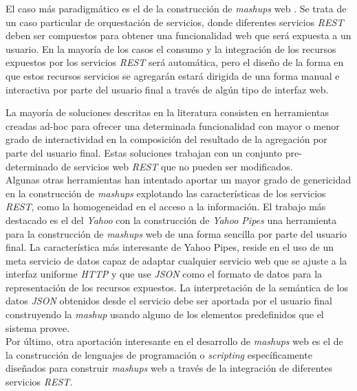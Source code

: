 El caso m\'as paradigm\'atico es el de la construcci\'on de \textit{mashups} web \cite{mashups}. Se trata de un caso particular de orquestaci\'on de servicios, donde diferentes servicios \textit{REST} deben ser compuestos para obtener una funcionalidad web que ser\'a expuesta a un usuario. En la mayor\'ia de los casos el consumo y la integraci\'on de los recursos expuestos por los servicios \textit{REST} ser\'a autom\'atica, pero el dise\~no de la forma en que estos recursos servicios se agregar\'an estar\'a dirigida de una forma manual e interactiva por parte del usuario final a trav\'es de alg\'un tipo de interfaz web.

La mayor\'ia de soluciones descritas en la literatura consisten en herramientas creadas ad-hoc para ofrecer una determinada funcionalidad con mayor o menor grado de interactividad en la composici\'on del resultado de la agregaci\'on por parte del usuario final. Estas soluciones trabajan con un conjunto pre-determinado de servicios web \textit{REST} que no pueden ser modificados.\\

Algunas otras herramientas han intentado aportar un mayor grado de genericidad en la construcci\'on de \textit{mashups} explotando las caracter\'isticas de los servicios \textit{REST}, como la homogeneidad en el acceso a la informaci\'on. El trabajo m\'as destacado es el del \textit{Yahoo} con la construcci\'on de \textit{Yahoo Pipes} \cite{yahoo_pipes} una herramienta para la construcci\'on de \textit{mashups} web de una forma sencilla por parte del usuario final. La caracter\'istica m\'as interesante de Yahoo Pipes, reside en el uso de un meta servicio de datos capaz de adaptar cualquier servicio web que se ajuste a la interfaz uniforme \textit{HTTP} y que use \textit{JSON} como el formato de datos para la representaci\'on de los recursos expuestos. La interpretaci\'on de la sem\'antica de los datos \textit{JSON} obtenidos desde el servicio debe ser aportada por el usuario final construyendo la \textit{mashup} usando alguno de los elementos predefinidos que el sistema provee.\\

Por \'ultimo, otra aportaci\'on interesante en el desarrollo de \textit{mashups} web es el de la construcci\'on de lenguajes de programaci\'on o \textit{scripting} \cite{sabbouh2007web} espec\'ificamente dise\~nados para construir \textit{mashups} web a trav\'es de la integraci\'on de diferentes servicios \textit{REST}.\\

